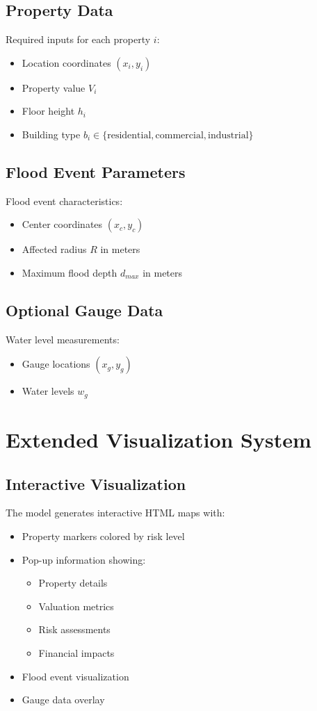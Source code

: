 \documentclass{article}
\begin{document}
\subsection{Property Data}
Required inputs for each property $i$:
\begin{itemize}
    \item Location coordinates $(x_i, y_i)$
    \item Property value $V_i$
    \item Floor height $h_i$
    \item Building type $b_i \in \{\text{residential}, \text{commercial}, \text{industrial}\}$
\end{itemize}

\subsection{Flood Event Parameters}
Flood event characteristics:
\begin{itemize}
    \item Center coordinates $(x_c, y_c)$
    \item Affected radius $R$ in meters
    \item Maximum flood depth $d_{max}$ in meters
\end{itemize}

\subsection{Optional Gauge Data}
Water level measurements:
\begin{itemize}
    \item Gauge locations $(x_g, y_g)$
    \item Water levels $w_g$
\end{itemize}

\section{Extended Visualization System}

\subsection{Interactive Visualization}
The model generates interactive HTML maps with:

\begin{itemize}
    \item Property markers colored by risk level
    \item Pop-up information showing:
    \begin{itemize}
        \item Property details
        \item Valuation metrics
        \item Risk assessments
        \item Financial impacts
    \end{itemize}
    \item Flood event visualization
    \item Gauge data overlay
\end{itemize}
\end{document}
